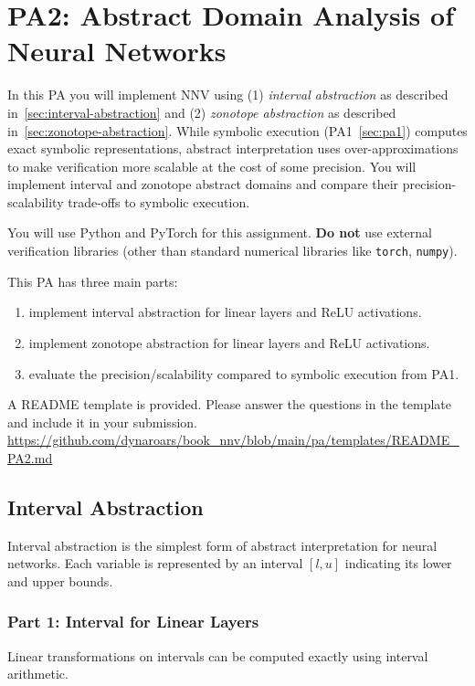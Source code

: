 \section{PA2: Abstract Domain Analysis of Neural Networks}\label{sec:pa2}

In this PA you will implement NNV using (1) \emph{interval abstraction} as described in~\autoref{sec:interval-abstraction} and (2) \emph{zonotope abstraction} as described in~\autoref{sec:zonotope-abstraction}. 
While symbolic execution (PA1~\autoref{sec:pa1}) computes exact symbolic representations, abstract interpretation uses over-approximations to make verification more scalable at the cost of some precision. You will implement interval and zonotope abstract domains and compare their precision-scalability trade-offs to symbolic execution.

You will use Python and PyTorch for this assignment. \textbf{Do not} use external verification libraries (other than standard numerical libraries like \texttt{torch}, \texttt{numpy}).

This PA has three main parts: 
\begin{enumerate}
    \item implement interval abstraction for linear layers and ReLU activations.
    \item implement zonotope abstraction for linear layers and ReLU activations.
    \item evaluate the precision/scalability compared to symbolic execution from PA1.
\end{enumerate}

A README template is provided. Please answer the questions in the template and include it in your submission. \url{https://github.com/dynaroars/book_nnv/blob/main/pa/templates/README_PA2.md}


\subsection{Interval Abstraction}

Interval abstraction is the simplest form of abstract interpretation for neural networks. Each variable is represented by an interval $[l, u]$ indicating its lower and upper bounds.

\subsubsection{Part 1: Interval for Linear Layers}

Linear transformations on intervals can be computed exactly using interval arithmetic.

